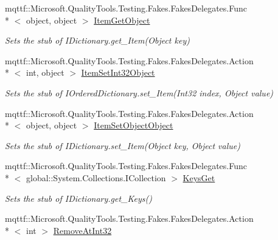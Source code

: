 \begin{DoxyCompactItemize}
mqttf\-::\-Microsoft.\-Quality\-Tools.\-Testing.\-Fakes.\-Fakes\-Delegates.\-Func\\*
$<$ object, object $>$ \hyperlink{class_system_1_1_collections_1_1_specialized_1_1_fakes_1_1_stub_i_ordered_dictionary_a82ab9cfc4c9125f81ed3369560fe7245}{Item\-Get\-Object}
\begin{DoxyCompactList}\small\item\em Sets the stub of I\-Dictionary.\-get\-\_\-\-Item(\-Object key)\end{DoxyCompactList}\item 
mqttf\-::\-Microsoft.\-Quality\-Tools.\-Testing.\-Fakes.\-Fakes\-Delegates.\-Action\\*
$<$ int, object $>$ \hyperlink{class_system_1_1_collections_1_1_specialized_1_1_fakes_1_1_stub_i_ordered_dictionary_ac2e95f4fe0e3d604c875ddfc38fef419}{Item\-Set\-Int32\-Object}
\begin{DoxyCompactList}\small\item\em Sets the stub of I\-Ordered\-Dictionary.\-set\-\_\-\-Item(\-Int32 index, Object value)\end{DoxyCompactList}\item 
mqttf\-::\-Microsoft.\-Quality\-Tools.\-Testing.\-Fakes.\-Fakes\-Delegates.\-Action\\*
$<$ object, object $>$ \hyperlink{class_system_1_1_collections_1_1_specialized_1_1_fakes_1_1_stub_i_ordered_dictionary_add4f4ad8fac3d13ad4d5309753632091}{Item\-Set\-Object\-Object}
\begin{DoxyCompactList}\small\item\em Sets the stub of I\-Dictionary.\-set\-\_\-\-Item(\-Object key, Object value)\end{DoxyCompactList}\item 
mqttf\-::\-Microsoft.\-Quality\-Tools.\-Testing.\-Fakes.\-Fakes\-Delegates.\-Func\\*
$<$ global\-::\-System.\-Collections.\-I\-Collection $>$ \hyperlink{class_system_1_1_collections_1_1_specialized_1_1_fakes_1_1_stub_i_ordered_dictionary_a83e9f59a5fb1ae3f714c86ae52e5bbb1}{Keys\-Get}
\begin{DoxyCompactList}\small\item\em Sets the stub of I\-Dictionary.\-get\-\_\-\-Keys()\end{DoxyCompactList}\item 
mqttf\-::\-Microsoft.\-Quality\-Tools.\-Testing.\-Fakes.\-Fakes\-Delegates.\-Action\\*
$<$ int $>$ \hyperlink{class_system_1_1_collections_1_1_specialized_1_1_fakes_1_1_stub_i_ordered_dictionary_a8c11325f71648d32b7371f8912354078}{Remove\-At\-Int32}

\end{DoxyCompactItemize}

